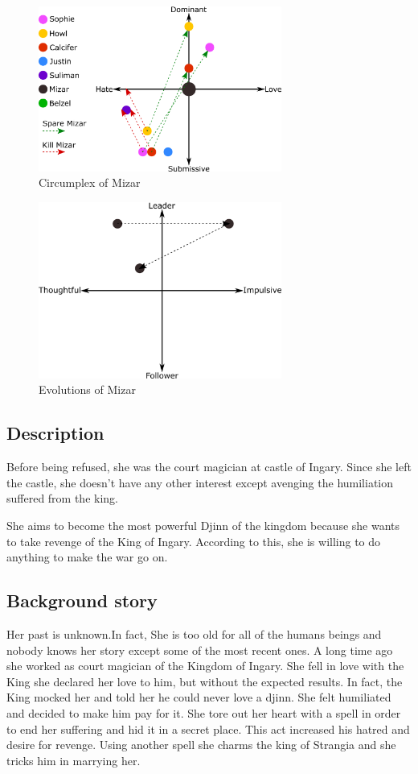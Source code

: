 \begin{figure}
  \centering
  \includegraphics[width=8cm]{Images/Circumplexes/mizarCircumplex}
  \caption{Circumplex of Mizar}
\end{figure}

\begin{figure}
  \centering
  \includegraphics[width=8cm]{Images/Evolutions/mizarEvolution}
  \caption{Evolutions of Mizar}
\end{figure}

\subsection{Description}
Before being refused, she was the court magician at castle of Ingary. Since she left the castle, she doesn't have any other interest except avenging the humiliation suffered from the king.

She aims to become the most powerful Djinn of the kingdom because she wants to take revenge of the King of Ingary. According to this, she is willing to do anything to make the war go on.

\subsection{Background story}
Her past is unknown.In fact, She is too old for all of the humans beings and nobody knows her story except some of the most recent ones. A long time ago she worked as court magician of the Kingdom of Ingary. She fell in love with the King she declared her love to him, but without the expected results. In fact, the King mocked her and told her he could never love a djinn. She felt humiliated and decided to make him pay for it. She tore out her heart with a spell in order to end her suffering and hid it in a secret place. This act increased his hatred and desire for revenge. Using another spell she charms the king of Strangia and she tricks him in marrying her.
